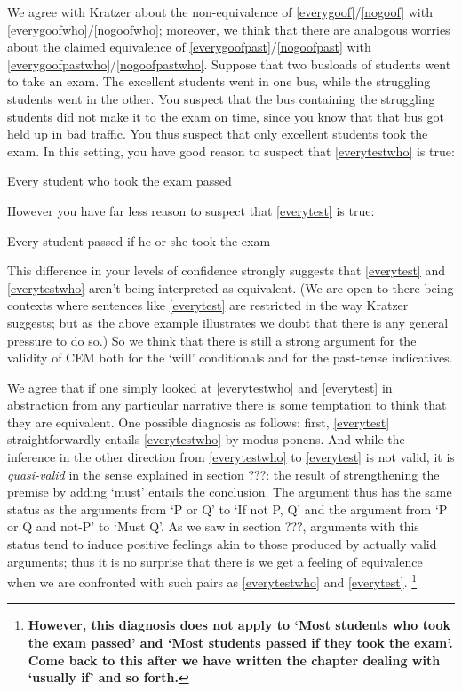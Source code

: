 \documentclass[If.tex]{subfiles}
\begin{document}
We agree with Kratzer about the non-equivalence of \ref{everygoof}/\ref{nogoof} with \ref{everygoofwho}/\ref{nogoofwho}; moreover, we think that there are analogous worries about the claimed equivalence of \ref{everygoofpast}/\ref{nogoofpast} with \ref{everygoofpastwho}/\ref{nogoofpastwho}. Suppose that two busloads of students went to take an exam. The excellent students went in one bus, while the struggling students went in the other. You suspect that the bus containing the struggling students did not make it to the exam on time, since you know that that bus got held up in bad traffic. You thus suspect that only excellent students took the exam. In this setting, you have good reason to suspect that \ref{everytestwho} is true:
\begin{prop}
	\nitem \label{everytestwho}
	Every student who took the exam passed
	\end{prop}
	However you have far less reason to suspect that \ref{everytest} is true:
	\begin{prop}
	\nitem \label{everytest}
	Every student passed if he or she took the exam
\end{prop}
This difference in your levels of confidence strongly suggests that \ref{everytest} and \ref{everytestwho} aren't being interpreted as equivalent. (We are open to there being contexts where sentences like \ref{everytest} are restricted in the way Kratzer suggests; but as the above example illustrates we doubt that there is any general pressure to do so.) So we think that there is still a strong argument for the validity of CEM both for the ‘will’ conditionals and for the past-tense indicatives.

We agree that if one simply looked at \ref{everytestwho} and \ref{everytest} in abstraction from any particular narrative there is some temptation to think that they are equivalent. One possible diagnosis as follows: first, \ref{everytest} straightforwardly entails \ref{everytestwho} by modus ponens. And while the inference in the other direction from \ref{everytestwho} to \ref{everytest} is not valid, it is \emph{quasi-valid} in the sense explained in section ???: the result of strengthening the premise by adding ‘must’ entails the conclusion. The argument thus has the same status as the arguments from ‘P or Q’ to ‘If not P, Q’ and the argument from ‘P or Q and not-P’ to ‘Must Q’. As we saw in section ???, arguments with this status tend to induce positive feelings akin to those produced by actually valid arguments; thus it is no surprise that there is we get a feeling of equivalence when we are confronted with such pairs as \ref{everytestwho} and \ref{everytest}.%
\footnote{\textbf{However, this diagnosis does not apply to ‘Most students who took the exam passed’ and ‘Most students passed if they took the exam’. Come back to this after we have written the chapter dealing with ‘usually if’ and so forth.}}
\end{document}
